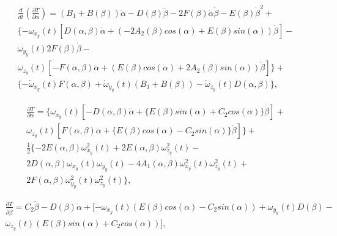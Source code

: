 \begin{equation}%
\label{eq:p3:42+}
\begin{multlined}
\frac{d}{d t}\left( \frac{\partial T}{\partial \dot \alpha}\right) = 
(B_1 + B(\beta)) \ddot{\alpha} - 
D(\beta) \ddot{\beta} - 
2F(\beta)\dot{\alpha}\dot{\beta} - 
E(\beta)\dot{\beta}^2 
+
\\
\{  
	-\omega_{x_y} (t) \left[ D(\alpha, \beta)\dot{\alpha} + (-2A_2(\beta)cos(\alpha)+E(\beta)sin(\alpha))\dot{\beta} \right] -\\
	\omega_{y_y} (t) 2F(\beta)\dot{\beta}-\\
	\omega_{z_y} (t) 
	\left[ 
		-F(\alpha, \beta)\dot{\alpha} + 
		(
			E(\beta)cos(\alpha) + 
			2A_2(\beta)sin(\alpha)
		) 
		\dot{\beta} 
	\right]
\}
+\\
\{
	-\dot{\omega}_{x_y} (t) F(\alpha, \beta)
	+\dot{\omega}_{y_y} (t) (B_1 + B(\beta))
	-\dot{\omega}_{z_y} (t) D(\alpha, \beta)
\}
  ,
\end{multlined}
\end{equation}


\begin{equation}%
\label{eq:p3:43}
\begin{multlined}
\frac{\partial T}{\partial \alpha}=
\{
	\omega_{x_y} (t) 
	\left[ 
		-D(\alpha, \beta)\dot{\alpha}
		+
		\{
			E(\beta) sin(\alpha) +
			C_2 cos(\alpha)
		\} \dot{\beta}
	\right]  +\\
	\omega_{z_y} (t)
	\left[ 
		F(\alpha, \beta)\dot{\alpha}
		+
		\{
		E(\beta) cos(\alpha) -
		C_2 sin(\alpha)
		\} \dot{\beta}
	\right] 
\}
  +\\
\frac{1}{2}
\{
 	-2E(\alpha, \beta)\omega^2_{x_y}(t) +
 	2E(\alpha, \beta)\omega^2_{z_y}(t)-\\
 	2D(\alpha, \beta)\omega_{x_y} (t) \omega_{y_y} (t)-
 	4A_1(\alpha, \beta)\omega^2_{x_y}(t) \omega^2_{z_y}(t) +\\
 	2F(\alpha, \beta)\omega^2_{y_y}(t) \omega^2_{z_y}(t)
\} 
  ,
\end{multlined}
\end{equation}


\begin{equation}%
\label{eq:p3:44}
\begin{multlined}
\frac{\partial T}{\partial \dot \beta}= 
C_2 \dot{\beta} - D(\beta)\dot{\alpha} + 
[ 
	-\omega_{x_y} (t) (E(\beta)cos(\alpha) - C_2 sin(\alpha))
	+\omega_{y_y} (t) D(\beta) - \\
	\omega_{z_y} (t) (E(\beta)sin(\alpha) + C_2 cos(\alpha))
]   ,
\end{multlined}
\end{equation}


